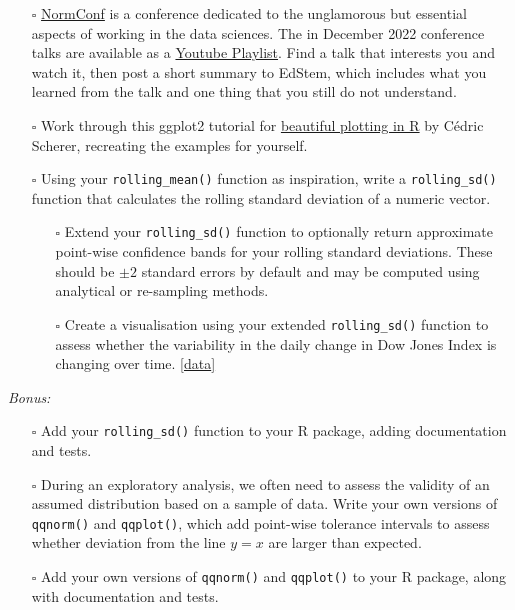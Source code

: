 \documentclass[
  12pt,
]{book}
\begin{document}
\begin{itemize}
\item[$\square$]
  \href{https://normconf.com/}{NormConf} is a conference dedicated to the unglamorous but essential aspects of working in the data sciences. The in December 2022 conference talks are available as a \href{https://www.youtube.com/@normconf/videos}{Youtube Playlist}. Find a talk that interests you and watch it, then post a short summary to EdStem, which includes what you learned from the talk and one thing that you still do not understand.
\item[$\square$]
  Work through this ggplot2 tutorial for \href{https://www.cedricscherer.com/2019/08/05/a-ggplot2-tutorial-for-beautiful-plotting-in-r/\#text}{beautiful plotting in R} by Cédric Scherer, recreating the examples for yourself.
\item[$\square$]
  Using your \texttt{rolling\_mean()} function as inspiration, write a \texttt{rolling\_sd()} function that calculates the rolling standard deviation of a numeric vector.

  \begin{itemize}
  \item[$\square$]
    Extend your \texttt{rolling\_sd()} function to optionally return approximate point-wise confidence bands for your rolling standard deviations. These should be \(\pm2\) standard errors by default and may be computed using analytical or re-sampling methods.
  \item[$\square$]
    Create a visualisation using your extended \texttt{rolling\_sd()} function to assess whether the variability in the daily change in Dow Jones Index is changing over time. \href{data/dowjones.csv}{{[}data{]}}
  \end{itemize}
\end{itemize}

\emph{Bonus:}

\begin{itemize}
\item[$\square$]
  Add your \texttt{rolling\_sd()} function to your R package, adding documentation and tests.
\item[$\square$]
  During an exploratory analysis, we often need to assess the validity of an assumed distribution based on a sample of data. Write your own versions of \texttt{qqnorm()} and \texttt{qqplot()}, which add point-wise tolerance intervals to assess whether deviation from the line \(y=x\) are larger than expected.
\item[$\square$]
  Add your own versions of \texttt{qqnorm()} and \texttt{qqplot()} to your R package, along with documentation and tests.
\end{itemize}
\end{document}
